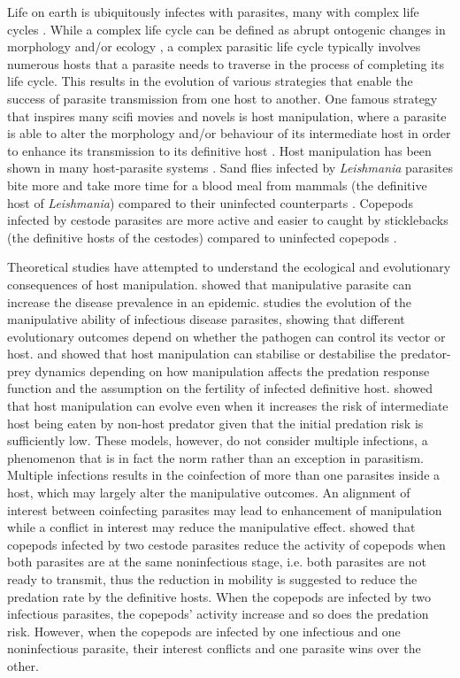 \documentclass[11pt]{article}
\begin{document}
Life on earth is ubiquitously infectes with parasites, many with complex life cycles \citep{zimmer:book:2001}. While a complex life cycle can be defined as abrupt ontogenic changes in morphology and/or ecology \citep{Benesh:2016dj}, a complex parasitic life cycle typically involves numerous hosts that a parasite needs to traverse in the process of completing its life cycle. This results in the evolution of various strategies that enable the success of parasite transmission from one host to another. One famous strategy that inspires many scifi movies and novels is host manipulation, where a parasite is able to alter the morphology and/or behaviour of its intermediate host in order to enhance its transmission to its definitive host \citep{Hughes2012}. Host manipulation has been shown in many host-parasite systems \citep{Hughes2012, molyneux_jefferies1986}. Sand flies infected by \textit{Leishmania} parasites bite more and take more time for a blood meal from mammals (the definitive host of \textit{Leishmania}) compared to their uninfected counterparts \citep{ Rogers2007}. Copepods infected by cestode parasites are more active and easier to caught by sticklebacks (the definitive hosts of the cestodes) compared to uninfected copepods \citep{Wedekind1996}. 


Theoretical studies have attempted to understand the ecological and evolutionary consequences of host manipulation. \cite{Roosien2013, Hosack2008} showed that manipulative parasite can increase the disease prevalence in an epidemic. \cite{Gandon2018} studies the evolution of the manipulative ability of infectious disease parasites, showing that different evolutionary outcomes depend on whether the pathogen can control its vector or host. \cite{Hadeler1989, Fenton2006} and \cite{Rogawa2018} showed that host manipulation can stabilise or destabilise the predator-prey dynamics depending on how manipulation affects the predation response function and the assumption on the fertility of infected definitive host. \cite{Seppl2008} showed that host manipulation can evolve even when it increases the risk of intermediate host being eaten by non-host predator given that the initial predation risk is sufficiently low. These models, however, do not consider multiple infections, a phenomenon that is in fact the norm rather than an exception in parasitism. Multiple infections results in the coinfection of more than one parasites inside a host, which may largely alter the manipulative outcomes. An alignment of interest between coinfecting parasites may lead to enhancement of manipulation while a conflict in interest may reduce the manipulative effect. \cite{Hafer:2015gl} showed that copepods infected by two cestode parasites reduce the activity of copepods when both parasites are at the same noninfectious stage, i.e. both parasites are not ready to transmit, thus the reduction in mobility is suggested to reduce the predation rate by the definitive hosts. When the copepods are infected by two infectious parasites, the copepods' activity increase and so does the predation risk. However, when the copepods are infected by one infectious and one noninfectious parasite, their interest conflicts and one parasite wins over the other. 
\end{document}
